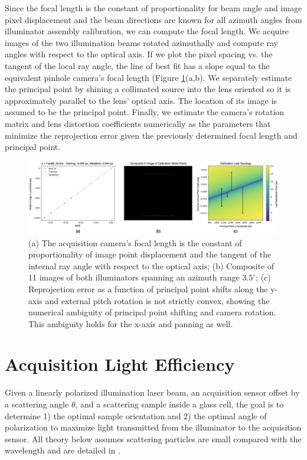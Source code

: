 Since the focal length is the constant of proportionality for beam angle and image pixel displacement and the beam directions are known for all azimuth angles from illuminator assembly calibration, we can compute the focal length. We acquire images of the two illumination beams rotated azimuthally and compute ray angles with respect to the optical axis. If we plot the pixel spacing vs. the tangent of the local ray angle, the line of best fit has a slope equal to the equivalent pinhole camera's focal length (Figure \ref{fig:acquisition_camera_calibration}(a,b). We separately estimate the principal point by shining a collimated source into the lens oriented so it is approximately parallel to the lens' optical axis. The location of its image is assumed to be the principal point. Finally, we estimate the camera's rotation matrix and lens distortion coefficients numerically as the parameters that minimize the reprojection error given the previously determined focal length and principal point.
\begin{figure}
    \centering
    \includegraphics[width=\linewidth]{../figures/acqusition_camera_calibration.png}
    \caption{(a) The acquisition camera's focal length is the constant of proportionality of image point displacement and the tangent of the internal ray angle with respect to the optical axis; (b) Composite of 11 images of both illuminators spanning an azimuth range $3.5^\circ$; (c) Reprojection error as a function of principal point shifts along the y-axis and external pitch rotation is not strictly convex, showing the numerical ambiguity of principal point shifting and camera rotation. This ambiguity holds for the x-axis and panning as well.}
    \label{fig:acquisition_camera_calibration}
\end{figure}


\section{Acquisition Light Efficiency}
Given a linearly polarized illumination laser beam, an acquisition sensor offset by a scattering angle $\theta$, and a scattering sample inside a glass cell, the goal is to determine 1) the optimal sample orientation and 2) the optimal angle of polarization to maximize light transmitted from the illuminator to the acquisition sensor. All theory below assumes scattering particles are small compared with the wavelength and are detailed in \cite{born2013principles}.


